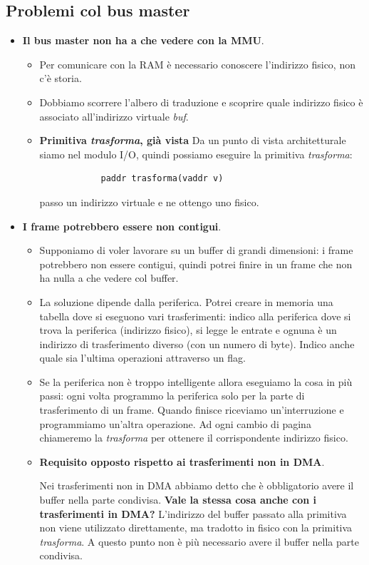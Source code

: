 \subsection{Problemi col bus master}
\begin{itemize}
	\item \textbf{Il bus master non ha a che vedere con la MMU}.
	\begin{itemize}
		\item Per comunicare con la RAM è necessario conoscere l'indirizzo fisico, non c'è storia.
		\item Dobbiamo scorrere l'albero di traduzione e scoprire quale indirizzo fisico è associato all'indirizzo virtuale  \emph{buf}.
		\item \textbf{Primitiva \emph{trasforma}, già vista} Da un punto di vista architetturale siamo nel modulo I/O, quindi possiamo eseguire la primitiva \emph{trasforma}:
		\begin{verbatim}
			paddr trasforma(vaddr v)
		\end{verbatim}
		passo un indirizzo virtuale e ne ottengo uno fisico.
	\end{itemize} 
	\item \textbf{I frame potrebbero essere non contigui}.
	\begin{itemize}
		\item Supponiamo di voler lavorare su un buffer di grandi dimensioni: i frame potrebbero non essere contigui, quindi potrei finire in un frame che non ha nulla a che vedere col buffer.
		\item La soluzione dipende dalla periferica. Potrei creare in memoria una tabella dove si eseguono vari trasferimenti: indico alla periferica dove si trova la periferica (indirizzo fisico), si legge le entrate e ognuna è un indirizzo di trasferimento diverso (con un numero di byte). Indico anche quale sia l'ultima operazioni attraverso un flag. 
		\item Se la periferica non è troppo intelligente allora eseguiamo la cosa in più passi: ogni volta programmo la periferica solo per la parte di trasferimento di un frame. Quando finisce riceviamo un'interruzione e programmiamo un'altra operazione. Ad ogni cambio di pagina chiameremo la \emph{trasforma} per ottenere il corrispondente indirizzo fisico.
		\item \textbf{Requisito opposto rispetto ai trasferimenti non in DMA}.
		
		Nei trasferimenti non in DMA abbiamo detto che è obbligatorio avere il buffer nella parte condivisa. \textbf{Vale la stessa cosa anche con i trasferimenti in DMA?} L'indirizzo del buffer passato alla primitiva non viene utilizzato direttamente, ma tradotto in fisico con la primitiva \emph{trasforma}. A questo punto non è più necessario avere il buffer nella parte condivisa.
	\end{itemize}
\end{itemize}
